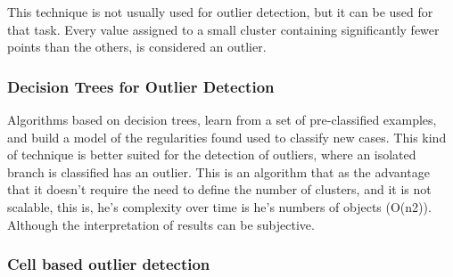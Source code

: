 \documentclass{llncs}
\begin{document}
This technique is not usually used for outlier detection, but it can be used for that task.
Every value assigned to a small cluster containing significantly fewer points than the others, is considered an outlier.

\subsubsection{Decision Trees for Outlier Detection}

Algorithms based on decision trees, learn from a set of pre-classified examples, and build a model of the regularities found used to classify new cases.
This kind of technique is better suited for the detection of outliers, where an isolated branch is classified has an outlier.
This is an algorithm that as the advantage that it doesn't require the need to define the number of clusters, and it is not scalable, this is, he's complexity over time is he's numbers of objects (O(n2)). Although the interpretation of results can be subjective.

\subsubsection{Cell based outlier detection}

\begin{thebibliography}{9}

\end{thebibliography}
\end{document}
